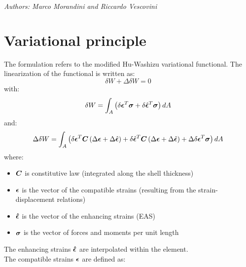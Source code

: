 \emph{Authors: Marco Morandini and Riccardo Vescovini}
\newcommand{ \fracd }[ 2 ]{ \frac{ \displaystyle{ #1 } }{ \displaystyle{ #2 }} }
\newcommand{ \fracdp }[ 2 ]{ \frac{ \displaystyle{ \partial #1 } }{ \displaystyle{ \partial #2 }} }
\newcommand{ \Rot }[ 1 ]{ \text{Rot} \plbr{ #1 } }
\newcommand{ \VecRot }[ 1 ]{ \text{VecRot} \plbr{ #1 } }
\newcommand{ \valxii }[ 0 ]{\plbr{ \T{ \xi }_{ i } } }
\newcommand{ \valxin }[ 0 ]{\plbr{ \T{ \xi }_{ n } } }
\newcommand{ \valxiA }[ 0 ]{\plbr{ \T{ \xi }_{ A } } }
\newcommand{ \valxio }[ 0 ]{\plbr{ \T{ \xi }_{ 0 } } }
\noindent


\section{Variational principle}
The formulation refers to the modified Hu-Washizu variational functional. The linearization of the functional is written as:
\begin{equation}
\delta W + \Delta \delta W = 0
\end{equation}
with:
\begin{equation}
\delta W = \int_A \left( 
\delta{\bm{\epsilon}}^T \bm{\sigma} + \delta \hat{\bm{\epsilon}}^T \bm{\sigma}
 \right) dA
\label{eq:deltaW}
\end{equation}
and:
\begin{equation}
\Delta \delta W = \int_A \left( 
\delta {\bm{\epsilon}} ^T  \bm{C} \left(  \Delta {\bm{\epsilon}}  + \Delta \hat{\bm{\epsilon}} \right) +
\delta \hat{\bm{\epsilon}} ^T  \bm{C} \left(  \Delta {\bm{\epsilon}}  + \Delta \hat{\bm{\epsilon}} \right) +
\Delta \delta { \bm{\epsilon} }^T \bm{\sigma}
 \right) dA
\label{eq:DeltadeltaW}
\end{equation}
where:
\begin{itemize}
\item $\bm{C}$ is constitutive law (integrated along the shell thickness)
\item $\bm{\epsilon}$ is the vector of the compatible strains (resulting from the strain-displacement relations)
\item $\bm{\hat{\epsilon}}$ is the vector of the enhancing strains (EAS)
\item $\bm{\sigma}$ is the vector of forces and moments per unit length
\end{itemize}
The enhancing strains $\bm{\hat{\epsilon}}$ are interpolated within the element.\\
The compatible strains $\bm{\epsilon}$ are defined as:
